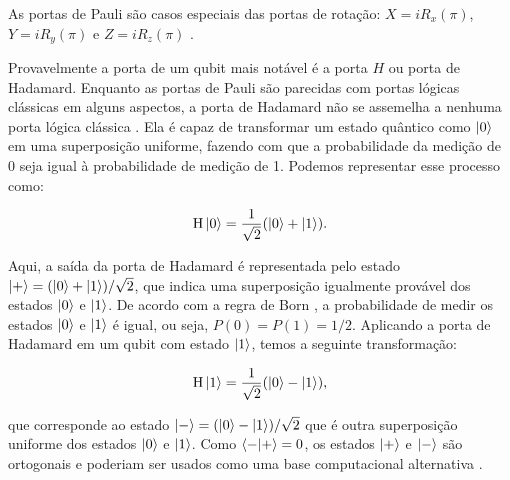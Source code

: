 \noindent As portas de Pauli são casos especiais das portas de rotação: $X=iR_x(\pi)$, $Y=iR_y(\pi)$ e $Z=iR_z(\pi)$ \cite{Zubairy2020}.

Provavelmente a porta de um qubit mais notável é a porta $H$ ou porta de Hadamard. Enquanto as portas de Pauli são parecidas com portas lógicas clássicas em alguns aspectos, a porta de Hadamard não se assemelha a nenhuma porta lógica clássica \cite{Mermin2007QComputerScience}. Ela é capaz de transformar um estado quântico como $\ket{0}$ em uma superposição uniforme, fazendo com que a probabilidade da medição de 0 seja igual à probabilidade de medição de 1. Podemos representar esse processo como:


\begin{equation}
\begin{centering}
\text{H}\ket{0} = \frac{1}{\sqrt{2}}(\ket{0} + \ket{1}).
\end{centering}
\end{equation}

\noindent Aqui, a saída da porta de Hadamard é representada pelo estado $\ket{+} = (\ket{0} + \ket{1})/\sqrt{2}$, que indica uma superposição igualmente provável dos estados $\ket{0}$ e $\ket{1}$. De acordo com a regra de Born \cite{Nielsen}, a probabilidade de medir os estados $\ket{0}$ e $\ket{1}$ é igual, ou seja, $P(0) = P(1) = 1/2$. Aplicando a porta de Hadamard em um qubit com estado $\ket{1}$, temos a seguinte transformação:

\begin{equation}
\begin{centering}
\text{H}\ket{1} = \frac{1}{\sqrt{2}}(\ket{0} - \ket{1}),
\end{centering}
\end{equation}

\noindent que corresponde ao estado $\ket{-} = (\ket{0} - \ket{1})/\sqrt{2}$ que é outra superposição uniforme dos estados $\ket{0}$ e $\ket{1}$. Como $\braket{-}{+} = 0$, os estados $\ket{+}$ e $\ket{-}$ são ortogonais e poderiam ser usados como uma base computacional alternativa \cite{Nielsen}.


